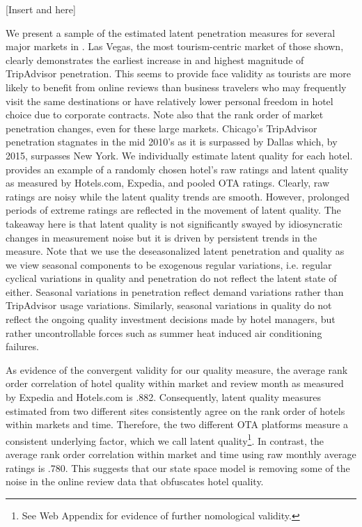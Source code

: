 \documentclass[mksc,blindrev]{informs3} %
\begin{document}
[Insert  and  here]

We present a sample of the estimated latent penetration measures for several major markets in . Las Vegas, the most tourism-centric market of those shown, clearly demonstrates the earliest increase in and highest magnitude of TripAdvisor penetration. This seems to provide face validity as tourists are more likely to benefit from online reviews than business travelers who may frequently visit the same destinations or have relatively lower personal freedom in hotel choice due to corporate contracts. Note also that the rank order of market penetration changes, even for these large markets. Chicago's TripAdvisor penetration stagnates in the mid 2010's as it is surpassed by Dallas which, by 2015, surpasses New York. We individually estimate latent quality for each hotel.  provides an example of a randomly chosen hotel's raw ratings and latent quality as measured by Hotels.com, Expedia, and pooled OTA ratings. Clearly, raw ratings are noisy while the latent quality trends are smooth. However, prolonged periods of extreme ratings are reflected in the movement of latent quality. The takeaway here is that latent quality is not significantly swayed by idiosyncratic changes in measurement noise but it is driven by persistent trends in the measure. Note that we use the deseasonalized latent penetration and quality as we view seasonal components to be exogenous regular variations, i.e. regular cyclical variations in quality and penetration do not reflect the latent state of either. Seasonal variations in penetration reflect demand variations rather than TripAdvisor usage variations. Similarly, seasonal variations in quality do not reflect the ongoing quality investment decisions made by hotel managers, but rather uncontrollable forces such as summer heat induced air conditioning failures.

As evidence of the convergent validity for our quality measure, the average rank order correlation of hotel quality within market and review month as measured by Expedia and Hotels.com is .882. Consequently, latent quality measures estimated from two different sites consistently agree on the rank order of hotels within markets and time. Therefore, the two different OTA platforms measure a consistent underlying factor, which we call latent quality\footnote{See Web Appendix for evidence of further nomological validity.}. In contrast, the average rank order correlation within market and time using raw monthly average ratings is .780. This suggests that our state space model is removing some of the noise in the online review data that obfuscates hotel quality.
\end{document}
